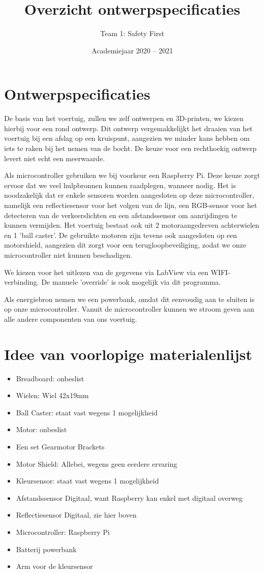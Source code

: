 \documentclass[a4paper,kulak]{kulakarticle} %
\date{Academiejaar 2020 -- 2021}
\title{Overzicht ontwerpspecificaties}
\author{Team 1: Safety First}
\begin{document}
\maketitle

\section{Ontwerpspecificaties}

De basis van het voertuig, zullen we zelf ontwerpen en 3D-printen, we kiezen hierbij voor een rond ontwerp. Dit ontwerp vergemakkelijkt het draaien van het voertuig bij een afslag op een kruispunt, aangezien we minder kans hebben om iets te raken bij het nemen van de bocht. De keuze voor een rechthoekig ontwerp levert niet echt een meerwaarde. 

Als microcontroller gebruiken we bij voorkeur een Raspberry Pi. Deze keuze zorgt ervoor dat we veel hulpbronnen kunnen raadplegen, wanneer nodig. Het is noodzakelijk dat er enkele sensoren worden aangesloten op deze microcontroller, namelijk een reflectiesensor voor het volgen van de lijn, een RGB-sensor voor het detecteren van de verkeerslichten en een afstandssensor om aanrijdingen te kunnen vermijden. Het voertuig bestaat ook uit 2 motoraangedreven achterwielen en 1 'ball caster'. De gebruikte motoren zijn tevens ook aangesloten op een motorshield, aangezien dit zorgt voor een terugloopbeveiliging, zodat we onze microcontroller niet kunnen beschadigen.

We kiezen voor het uitlezen van de gegevens via LabView via een WIFI-verbinding. De manuele 'override' is ook mogelijk via dit programma.

Als energiebron nemen we een powerbank, omdat dit eenvoudig aan te sluiten is op onze microcontroller. Vanuit de microcontroller kunnen we stroom geven aan alle andere componenten van ons voertuig.

\section{Idee van voorlopige materialenlijst}

\begin{itemize}
	\item Breadboard: onbeslist
	\item Wielen: Wiel 42x19mm
	\item Ball Caster: staat vast wegens 1 mogelijkheid
	\item Motor: onbeslist
	\item Een set Gearmotor Brackets
	\item Motor Shield: Allebei, wegens geen eerdere ervaring
	\item Kleursensor: staat vast wegens 1 mogelijkheid
	\item Afstandssensor Digitaal, want Raspberry kan enkel met digitaal overweg 
	\item Reflectiesensor Digitaal, zie hier boven
	\item Microcontroller: Raspberry Pi
	\item Batterij powerbank
	\item Arm voor de kleursensor
		
\end{itemize}
\end{document}
